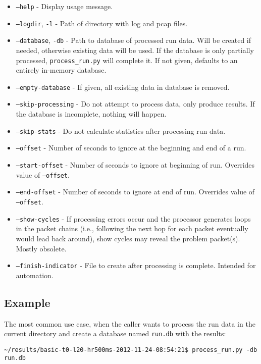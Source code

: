 \begin{itemize}
\item \texttt{--help} - Display usage message.
\item \texttt{--logdir}, \texttt{-l} - Path of directory with log and pcap files.
\item \texttt{--database}, \texttt{-db} - Path to database of processed run data. Will be created if needed, otherwise existing data will be used. If the database is only partially processed, \texttt{process\_run.py} will complete it. If not given, defaults to an entirely in-memory database.
\item \texttt{--empty-database} - If given, all existing data in database is removed.
\item \texttt{--skip-processing} - Do not attempt to process data, only produce results. If the database is incomplete, nothing will happen.
\item \texttt{--skip-stats} - Do not calculate statistics after processing run data.
\item \texttt{--offset} - Number of seconds to ignore at the beginning and end of a run.
\item \texttt{--start-offset} - Number of seconds to ignore at beginning of run. Overrides value of \texttt{--offset}.
\item \texttt{--end-offset} - Number of seconds to ignore at end of run. Overrides value of \texttt{--offset}.
\item \texttt{--show-cycles} - If processing errors occur and the processor generates loops in the packet chains (i.e., following the next hop for each packet eventually would lead back around), show cycles may reveal the problem packet(s). Mostly obsolete.
\item \texttt{--finish-indicator} - File to create after processing is complete. Intended for automation.
\end{itemize}

\subsection{Example}
\par The most common use case, when the caller wants to process the run data in the current directory and create a database named \texttt{run.db} with the results:
\begin{lstlisting}
~/results/basic-t0-l20-hr500ms-2012-11-24-08:54:21$ process_run.py -db run.db
\end{lstlisting}

